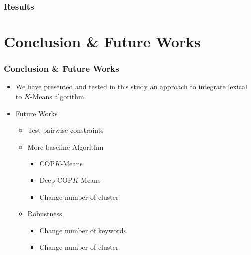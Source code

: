 \documentclass{beamer}
\begin{document}
\begin{frame}
\frametitle{Results}
\begin{table}[!h]
\end{table}
\end{frame}

\section{Conclusion \& Future Works}

\begin{frame}
  \frametitle{Conclusion \& Future Works}
\begin{itemize}
\item We have presented and tested in this study an approach to integrate lexical to $K$-Means algorithm. \pause 
\item Future Works
\begin{itemize}
\item Test pairwise constraints
\item More baseline Algorithm
\begin{itemize}
\item COP$K$-Means
\item Deep COP$K$-Means
\item Change number of cluster
\end{itemize}
\item Robustness
\begin{itemize}
\item Change number of keywords
\item Change number of cluster
\end{itemize}
\end{itemize}
\end{itemize}
\end{frame}
\end{document}
